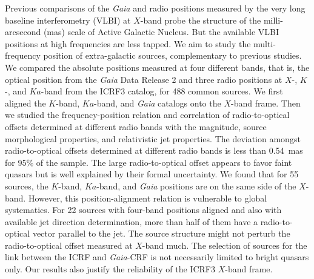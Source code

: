 \documentclass{aa}
\begin{document}
  \abstract
   {
       Previous comparisons of the \textit{Gaia} and radio positions measured by the very long baseline interferometry (VLBI) at $X$-band probe the structure of the milli-arcsecond (mas) scale of Active Galactic Nucleus.
       But the available VLBI positions at high frequencies are less tapped.
   }
   {
       We aim to study the multi-frequency position of extra-galactic sources, complementary to previous studies.}
   {
       We compared the absolute positions measured at four different bands,
       that is, the optical position from the {\it Gaia} Data Release 2 and three radio positions at $X$-, $K$-, and $Ka$-band from the ICRF3 catalog, for 488 common sources.
       We first aligned the $K$-band, $Ka$-band, and \textit{Gaia} catalogs onto the $X$-band frame.
       Then we studied the frequency-position relation and correlation of radio-to-optical offsets determined at different radio bands
       with the magnitude, source morphological properties, and relativistic jet properties.
   }
   {
       The deviation amongst radio-to-optical offsets determined at different radio bands is less than 0.54~mas for 95\% of the sample.
       The large radio-to-optical offset appears to favor faint quasars but is well explained by their formal uncertainty.
       We found that for 55 sources, the $K$-band, $Ka$-band, and \textit{Gaia} positions are on the same side of the $X$-band.
       However, this position-alignment relation is vulnerable to global systematics.
       For 22 sources with four-band positions aligned and also with available jet direction determination, more than half of them have a radio-to-optical vector parallel to the jet.
   }
   {
       The source structure might not perturb the radio-to-optical offset measured at $X$-band much.
       The selection of sources for the link between the ICRF and \textit{Gaia}-CRF is not necessarily limited to bright quasars only.
       Our results also justify the reliability of the ICRF3 $X$-band frame.
   }
\end{document}
